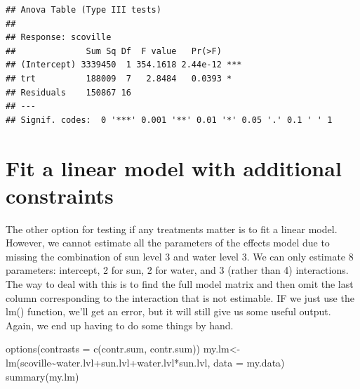 \documentclass[
]{book}
\newenvironment{Shaded}{\begin{snugshade}}{\end{snugshade}}
\newcommand{\AttributeTok}[1]{\textcolor[rgb]{0.77,0.63,0.00}{#1}}
\newcommand{\FunctionTok}[1]{\textcolor[rgb]{0.00,0.00,0.00}{#1}}
\newcommand{\NormalTok}[1]{#1}
\newcommand{\OtherTok}[1]{\textcolor[rgb]{0.56,0.35,0.01}{#1}}
\newcommand{\SpecialCharTok}[1]{\textcolor[rgb]{0.00,0.00,0.00}{#1}}
\newcommand{\StringTok}[1]{\textcolor[rgb]{0.31,0.60,0.02}{#1}}
\begin{document}
\begin{verbatim}
## Anova Table (Type III tests)
## 
## Response: scoville
##              Sum Sq Df  F value   Pr(>F)    
## (Intercept) 3339450  1 354.1618 2.44e-12 ***
## trt          188009  7   2.8484   0.0393 *  
## Residuals    150867 16                      
## ---
## Signif. codes:  0 '***' 0.001 '**' 0.01 '*' 0.05 '.' 0.1 ' ' 1
\end{verbatim}

\hypertarget{fit-a-linear-model-with-additional-constraints}{%
\section{Fit a linear model with additional constraints}\label{fit-a-linear-model-with-additional-constraints}}

The other option for testing if any treatments matter is to fit a linear model. However, we cannot estimate all the parameters of the effects model due to missing the combination of sun level 3 and water level 3. We can only estimate 8 parameters: intercept, 2 for sun, 2 for water, and 3 (rather than 4) interactions. The way to deal with this is to find the full model matrix and then omit the last column corresponding to the interaction that is not estimable. IF we just use the lm() function, we'll get an error, but it will still give us some useful output. Again, we end up having to do some things by hand.

\begin{Shaded}
\begin{Highlighting}[]
\FunctionTok{options}\NormalTok{(}\AttributeTok{contrasts =} \FunctionTok{c}\NormalTok{(}\StringTok{\textquotesingle{}contr.sum\textquotesingle{}}\NormalTok{, }\StringTok{\textquotesingle{}contr.sum\textquotesingle{}}\NormalTok{))}
\NormalTok{my.lm}\OtherTok{\textless{}{-}}\FunctionTok{lm}\NormalTok{(scoville}\SpecialCharTok{\textasciitilde{}}\NormalTok{water.lvl}\SpecialCharTok{+}\NormalTok{sun.lvl}\SpecialCharTok{+}\NormalTok{water.lvl}\SpecialCharTok{*}\NormalTok{sun.lvl, }\AttributeTok{data =}\NormalTok{ my.data)}
\FunctionTok{summary}\NormalTok{(my.lm)}
\end{Highlighting}
\end{Shaded}
\end{document}
